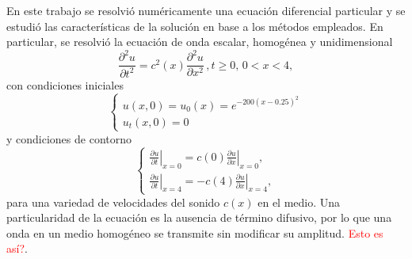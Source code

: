 \documentclass[aps,prb,twocolumn,superscriptaddress,floatfix,longbibliography,10pt]{revtex4-2}
\newcounter{para}
\begin{document}
En este trabajo se resolvió numéricamente una ecuación diferencial particular y se estudió las características de la solución en base a los métodos empleados. En particular, se resolvió la ecuación de onda escalar, homogénea y unidimensional
\begin{equation}
  \frac{\partial^2 u}{\partial t^2} = c^2(x)\frac{\partial^2 u}{\partial x^2} \,, t \geq 0, \,  0 < x < 4,
  \label{eq:ecuacion_ondas}
\end{equation}
con condiciones iniciales
\begin{equation}
  \left\{\begin{matrix}
    u(x,0) = u_0(x) = e^{-200 (x-0.25)^2} \\
    u_t(x,0) = 0
   \end{matrix}\right.
  \label{eq:condiciones_iniciales}
\end{equation}
y condiciones de contorno
\begin{equation}
  \left \{\begin{matrix}
    \left . \frac{\partial u}{\partial t} \right |_{x=0} = c(0) \left . \frac{\partial u}{\partial x} \right |_{x=0} ,\\
    \left . \frac{\partial u}{\partial t} \right |_{x=4} = - c(4) \left . \frac{\partial u}{\partial x} \right |_{x=4},
   \end{matrix}\right .
  \label{eq:condiciones_contorno}
\end{equation}
para una variedad de velocidades del sonido $c(x)$ en el medio. Una particularidad de la ecuación es la ausencia de término difusivo, por lo que una onda en un medio homogéneo se transmite sin modificar su amplitud. \textcolor{red}{Esto es así?}. 


\end{document}
